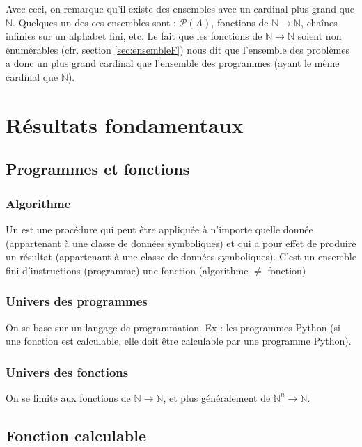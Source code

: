 \bigskip

Avec ceci, on remarque qu'il existe des ensembles avec un cardinal plus grand que $\mathbb{N}$. Quelques un des ces ensembles sont : $\mathcal{P}(A)$, fonctions de $\mathbb{N} \rightarrow \mathbb{N}$, chaînes infinies sur un alphabet fini, etc. Le fait que les fonctions de $\mathbb{N} \rightarrow \mathbb{N}$ soient non énumérables (cfr. section \ref{sec:ensembleF}) nous dit que l'ensemble des problèmes a donc un plus grand cardinal que l'ensemble des programmes (ayant le même cardinal que $\mathbb{N}$).

\chapter{Résultats fondamentaux}

\section{Programmes et fonctions}

\subsection{Algorithme}

Un  est une procédure qui peut être appliquée à n'importe quelle donnée (appartenant à une classe de données symboliques) et qui a pour effet de produire un résultat (appartenant à une classe de données symboliques). C'est un ensemble fini d'instructions (programme)  une fonction (algorithme $\neq$ fonction)

\subsection{Univers des programmes}

On se base sur un langage de programmation. Ex : les programmes Python (si une fonction est calculable, elle doit être calculable par une programme Python).

\subsection{Univers des fonctions}

On se limite aux fonctions de $\mathbb{N} \rightarrow \mathbb{N}$, et plus généralement de $\mathbb{N}^n \rightarrow \mathbb{N}$.

\section{Fonction calculable}

